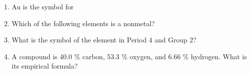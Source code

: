\documentclass[main.tex]{subfiles}
\begin{document}
\begin{fullwidth}
\begin{multicols*}{2}
\begin{enumerate}
\item Au is the symbol for
\begin{enumerate}[label=(\alph*)]\vspace{-0.5cm}
\end{enumerate}\vspace{-0.5cm}



\item Which of the following elements is a nonmetal?
\begin{enumerate}[label=(\alph*)]\vspace{-0.5cm}
\end{enumerate}\vspace{-0.5cm}

\item What is the symbol of the element in Period 4 and Group 2?
\begin{enumerate}[label=(\alph*)]\vspace{-0.5cm}
\end{enumerate}\vspace{-0.5cm}
\item A compound is 40.0 \% carbon, 53.3 \% oxygen, and 6.66 \% hydrogen. What is its empirical formula?
 \begin{enumerate}[label=(\alph*)]\vspace{-0.5cm}
\end{enumerate}\vspace{-0.5cm}



    \setcounter{enumTemp}{\theenumi}
\end{enumerate}
\end{multicols*}
\end{fullwidth}
\end{document}
